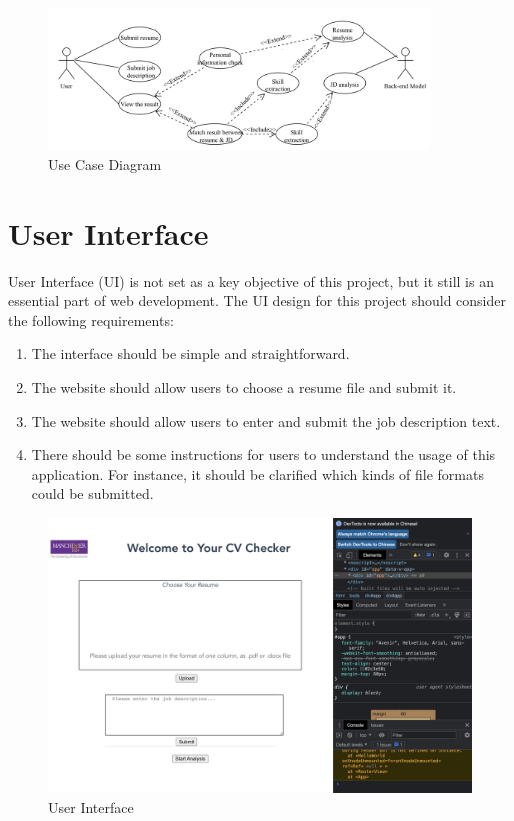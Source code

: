  \begin{figure}[H]
    \centering
    \includegraphics[width=0.9\textwidth]{images/usecase_diagram.png}
    \caption{Use Case Diagram}
    \label{fig:20}
\end{figure}


\section{User Interface}

User Interface (UI) is not set as a key objective of this project, but it still is an essential part of web development. The UI design for this project should consider the following requirements:

\begin{enumerate}
    \item The interface should be simple and straightforward.
    
    \item The website should allow users to choose a resume file and submit it. 
    
    \item The website should allow users to enter and submit the job description text.
    
    \item There should be some instructions for users to understand the usage of this application. For instance, it should be clarified which kinds of file formats could be submitted.
\end{enumerate}


 \begin{figure}[H]
    \centering
    \includegraphics[width=1.2\textwidth]{images/ui.png}
    \caption{User Interface}
    \label{fig:35}
\end{figure}

